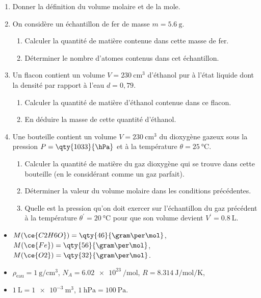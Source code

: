 \begin{enumerate}
    \item Donner la définition du volume molaire et de la mole.
    \item On considère un échantillon de fer  de masse
          $m=\qty{5.6}{\g}$.
          \begin{enumerate}
              \item Calculer la quantité de matière contenue dans cette masse de
                    fer.
              \item Déterminer le nombre d'atomes contenus dans cet échantillon.
          \end{enumerate}
    \item Un flacon contient un volume $V=\qty{230}{\cubic\cm}$ d'éthanol
           pur à l'état liquide dont la densité par rapport à l'eau
          $d=0,79$.
          \begin{enumerate}
              \item Calculer la quantité de matière d'éthanol contenue dans ce
                    flacon.
              \item En déduire la masse de cette quantité d'éthanol.
          \end{enumerate}
    \item Une bouteille contient un volume $V=\qty{230}{\cubic\cm}$ du dioxygène
           gazeux sous la pression $P=\qty{1033}{\hPa}$
          et à la température $\theta=\qty{25}{\degreeCelsius}$.
          \begin{enumerate}
              \item Calculer la quantité de matière du gaz dioxygène qui se
                    trouve dans cette bouteille (en le considérant comme un gaz
                    parfait).
              \item Déterminer la valeur du volume molaire dans les conditions
                    précédentes.
              \item Quelle est la pression qu'on doit exercer sur l'échantillon
                    du gaz précédent à la température
                    $\theta^{\prime}=\qty{20}{\degreeCelsius}$ pour que son
                    volume devient $V^{\prime}=\qty{0,8}{\liter}$.
          \end{enumerate}
\end{enumerate}
\begin{donnees}
    \begin{itemize}
        \item $M(\ce{C2H6O})=\qty{46}{\gram\per\mol}$, \;
              $M(\ce{Fe})=\qty{56}{\gram\per\mol}$, \;
              $M(\ce{O2})=\qty{32}{\gram\per\mol}$.
        \item $\rho_{\text{eau}}=\qty{1}{\gram\per\cubic\cm}$, \;
              $N_{A}=\qty{6.02e23}{\per\mol}$, \;
              $R=\qty{8,314}{\J\per\mol\per\K}$,
        \item $\qty{1}{\liter}=\qty{1e-3}{\cubic\meter}$, \;
              $\qty{1}{\hecto\Pa}=\qty{100}{\Pa}$.
    \end{itemize}
\end{donnees}
